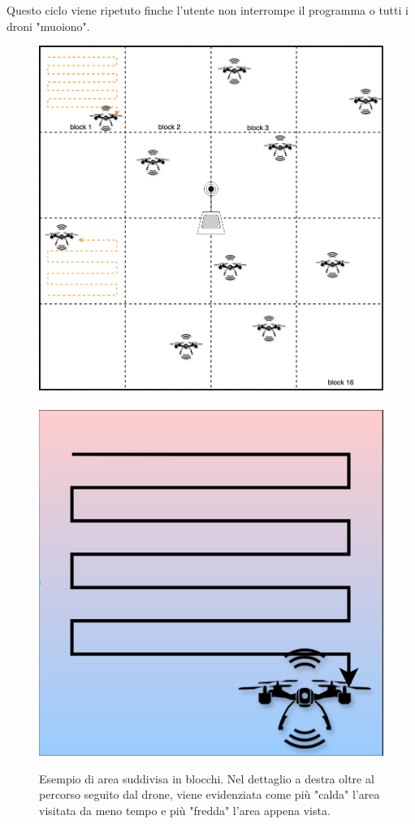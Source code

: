 \documentclass[a4paper, 11pt]{article}
\begin{document}
Questo ciclo viene ripetuto finche l'utente non interrompe il programma o tutti i droni "muoiono".
\begin{figure}[h]
    \centering
    \includegraphics[height = 8 cm]{image/DroniInArea.png}%
    \ 
    \includegraphics[height = 4 cm]{image/DroneInBlock.png}
    \caption{Esempio di area suddivisa in blocchi. Nel dettaglio a destra oltre al percorso seguito dal drone, viene evidenziata come più "calda" l'area visitata da meno tempo e più "fredda" l'area appena vista.}
\end{figure}
\end{document}

